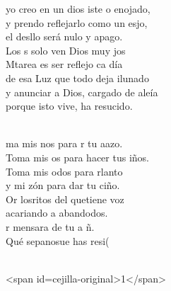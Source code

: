 \begin{cancion}%
	 yo creo en un dios iste o enojado,\\
	y prendo reflejarlo como un esjo,\\
	el desllo será nulo y apago.\\
	Los s solo ven Dios muy jos  \\
	Mtarea es ser reflejo ca día\\
	de esa Luz que todo deja ilunado\\
	y anunciar a Dios, cargado de aleía\\
	porque isto vive, ha resucido.\\\jump\\
	\begin{chorus}%
	ma mis nos para r tu aazo.\\
	Toma mis os para hacer tus iños.\\
	Toma mis odos para rlanto\\
	y mi zón para dar tu ciño.\\
	Or losritos del quetiene voz\\
	acariando a abandodos.\\
	r mensara de tu a ñ. \\
	Qué sepanosue has resi(\\
	\end{chorus}%
	\jump\\
<span id=cejilla-original>1</span>\\
\end{cancion}%
